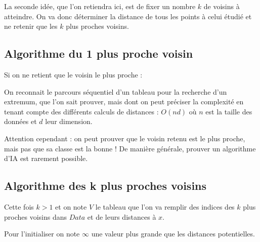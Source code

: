 La seconde idée, que l'on retiendra ici, est de fixer un nombre $k$ de voisins à atteindre. On va donc déterminer la distance de tous les points à celui étudié et ne retenir que les $k$ plus proches voisins.


\subsection{Algorithme du 1 plus proche voisin}

Si on ne retient que le voisin le plus proche :

\begin{algorithm}[H]
\end{algorithm}

On reconnait le parcours séquentiel d'un tableau pour la recherche d'un extremum, que l'on sait prouver, mais dont on peut préciser la complexité en tenant compte des différents calculs de distances : $O(nd)$ où $n$ est la taille des données et $d$ leur dimension.

Attention cependant : on peut prouver que le voisin retenu est le plus proche, mais pas que sa classe est la bonne ! De manière générale, prouver un algorithme d'IA est rarement possible.



\subsection{Algorithme des k plus proches voisins}

Cette fois $k>1$ et on note $V$ le tableau que l'on va remplir des indices des $k$ plus proches voisins dans $Data$ et de leurs distances à $x$.

Pour l'initialiser on note $\infty$ une valeur plus grande que les distances potentielles.

\begin{algorithm}[H]
\end{algorithm}


